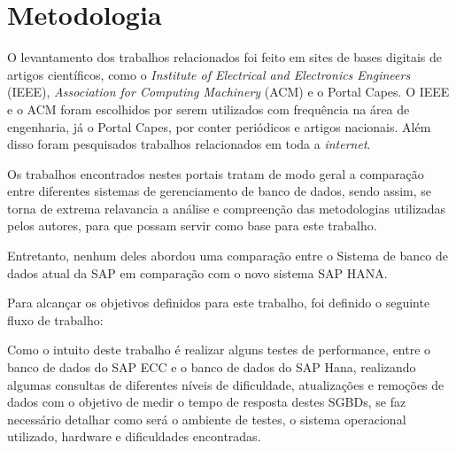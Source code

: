 \chapter{Metodologia}
\label{cap3}

\vspace{-1.9cm}

O levantamento dos trabalhos relacionados foi feito em sites de bases digitais de artigos científicos, como o \textit{Institute of Electrical and Electronics Engineers} (IEEE), \textit{Association for Computing Machinery} (ACM) e o Portal Capes. O IEEE e o ACM foram escolhidos por serem utilizados com frequência na área de engenharia, já o Portal Capes, por conter periódicos e artigos nacionais. Além disso foram pesquisados trabalhos relacionados em toda a \textit{internet}.

Os trabalhos encontrados nestes portais tratam de modo geral a comparação entre diferentes sistemas de gerenciamento de banco de dados, sendo assim, se torna de extrema relavancia a análise e compreenção das metodologias utilizadas pelos autores, para que possam servir como base para este trabalho. 

Entretanto, nenhum deles abordou uma comparação entre o Sistema de banco de dados atual da SAP em comparação com o novo sistema SAP HANA. 


Para alcançar os objetivos definidos para este trabalho, foi definido o seguinte fluxo de trabalho: 





Como o intuito deste trabalho é realizar alguns testes de performance, entre o banco de dados do SAP ECC e o banco de dados do SAP Hana, realizando algumas consultas de diferentes níveis de dificuldade, atualizações e remoções de dados com o objetivo de medir o tempo de resposta destes SGBDs, se faz necessário detalhar como será o ambiente de testes, o sistema operacional utilizado, hardware e dificuldades encontradas. 

